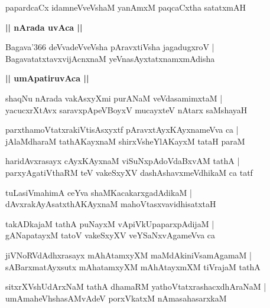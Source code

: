 \documentclass[twoside,12pt,openright]{book}
\newcounter{shloka}[chapter]
\def\uvaca#1{\centerline{{\large\textbf{#1}}}}
\begin{document}
\begin{shloka}%
papardcaCx idamneVveVshaM yanAmxM paqcaCxtha satatxmAH
\end{shloka}

\uvaca{|| nArada uvAca ||}

\begin{shloka}%
Bagava\char'366 deVvadeVveVsha pAravxtiVsha jagadugxroV |\\
BagavatatxtavxvijAcnxnaM yeVnasAyxtatxnamxmAdisha
\end{shloka}

\uvaca{|| umApatiruvAca ||}

\begin{shloka}%
shaqNu nArada vakAsxyXmi purANaM veVdasamimxtaM |\\
yacucxrXtAvx saravxpApeVBoyxV mucayxteV nAtarx saMshayaH
\end{shloka}

\begin{shloka}%
parxthamoVtatxrakiVtisAsxyxtf pAravxtAyxKAyxnameVva ca |\\
jAlaMdharaM tathAKayxnaM shirxVsheYlAKayxM tataH paraM 
\end{shloka}

\begin{shloka}%
haridAvxrasayx cAyxKAyxnaM viSuNxpAdoVdaBxvAM tathA |\\
parxyAgatiVthaRM teV vakeSxyXV dashAshavxmeVdhikaM ca tatf
\end{shloka}

\begin{shloka}%
tuLasiVmahimA ceYva shaMKacakarxgadAdikaM |\\
dAvxrakAyAsatxthAKAyxnaM mahoVtasxvavidhisatxtaH 
\end{shloka}

\begin{shloka}%
takADkajaM tathA puNayxM vApiVkUpaparxpAdijaM |\\
gANapatayxM tatoV vakeSxyXV veYSaNxvAgameVva ca 
\end{shloka}

\begin{shloka}%
jiVNoRVdAdhxrasayx mAhAtamxyXM maMdAkiniVsamAgamaM |\\
sABarxmatAyxsutx mAhatamxyXM mAhAtayxmXM tiVrajaM tathA 
\end{shloka}

\begin{shloka}%
sitxrXVshUdArxNaM tathA dhamaRM yathoVtatxrashacxdhAraNaM |\\
umAmaheVhshasAMvAdeV porxVkatxM nAmasahasarxkaM 
\end{shloka}
\end{document}
